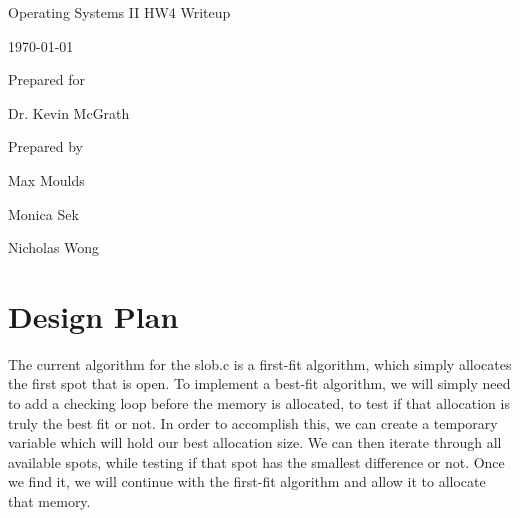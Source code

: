 \documentclass[onecolumn, draftclsnofoot,10pt, compsoc]{IEEEtran}
\def \GroupMemberOne{     Max Moulds}
\def \GroupMemberTwo{     Monica Sek}
\def \GroupMemberThree{     Nicholas Wong}
\def \ProfessorPerson{    Dr. Kevin McGrath}
\def \DocType{    HW4 Writeup
        }
\newcommand{\NameSigPair}[1]{\par
\makebox[2.75in][r]{#1} \hfil   \makebox[3.25in]{\makebox[2.25in]{\hrulefill} \hfill    \makebox[.75in]{\hrulefill}}
\par\vspace{-12pt} \textit{\tiny\noindent
\makebox[2.75in]{} \hfil    \makebox[3.25in]{\makebox[2.25in][r]{Signature} \hfill  \makebox[.75in][r]{Date}}}}
\begin{document}
\begin{titlepage}
    \begin{singlespace}
        \hfill
        \par\vspace{.2in}
        \centering
        \scshape{
            \huge Operating Systems II \DocType \par
            {\large\today}\par
            \vspace{.5in}
            \vfill
            \vspace{5pt}
            {\large Prepared for }\par
            \ProfessorPerson\par
            {\large Prepared by }\par
            \GroupMemberOne\par
            \GroupMemberTwo\par
            \GroupMemberThree\par
            \vspace{5pt}
            \vspace{20pt}
        }
        \begin{abstract}
          This document is the writeup for homework 4 of Operating Systems II Spring term 2018, written by Group 20.
          \end{abstract}
    \end{singlespace}
\end{titlepage}
\newpage
{}
\tableofcontents
\clearpage

\section{Design Plan}
The current algorithm for the slob.c is a first-fit algorithm, which simply allocates the first spot that is open. To implement a best-fit algorithm, we will simply need to add a checking loop before the memory is allocated, to test if that allocation is truly the best fit or not. In order to accomplish this, we can create a temporary variable which will hold our best allocation size. We can then iterate through all available spots, while testing if that spot has the smallest difference or not. Once we find it, we will continue with the first-fit algorithm and allow it to allocate that memory.
\end{document}
